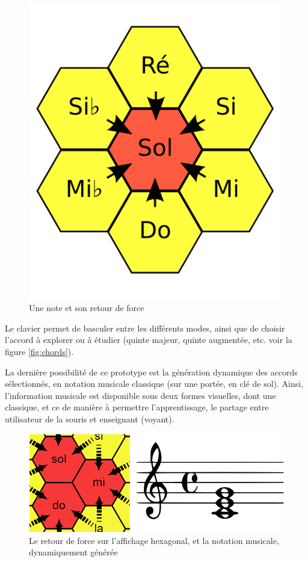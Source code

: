 \documentclass[
]{book}
\begin{document}
\begin{figure}
\centering
\includegraphics{img/noteSeule.svg}
\caption{\label{fig:noteseule}Une note et son retour de force}
\end{figure}

Le clavier permet de basculer entre les différents modes, ainsi que de
choisir l'accord à explorer ou à étudier (quinte majeur, quinte augmentée,
etc. voir la figure \ref{fig:chords}).

La dernière possibilité de ce prototype est la génération dynamique des
accords sélectionnés, en notation musicale classique (sur une portée, en clé
de sol). Ainsi, l'information musicale est disponible sous deux formes
visuelles, dont une classique, et ce de manière à permettre l'apprentissage,
le partage entre utilisateur de la souris et enseignant (voyant).

\begin{figure}
\centering
\includegraphics{img/musichaptic.png}
\caption{\label{fig:musichaptique}Le retour
de force sur l'affichage hexagonal, et la notation musicale,
dynamiquement générée}
\end{figure}
\end{document}

